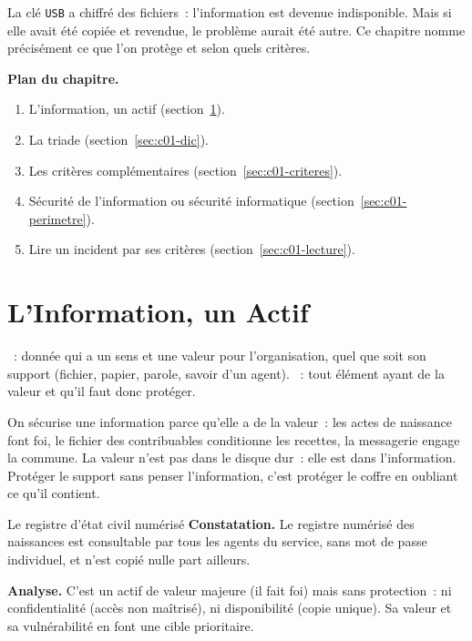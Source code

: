 La clé \texttt{USB} a chiffré des fichiers~: l'information est devenue
indisponible. Mais si elle avait été copiée et revendue, le problème aurait
été autre. Ce chapitre nomme précisément ce que l'on protège et selon quels
critères.

\medskip
\textbf{Plan du chapitre.}
\begin{enumerate}
    \item L'information, un actif (section~\ref{sec:c01-actif}).
    \item La triade  (section~\ref{sec:c01-dic}).
    \item Les critères complémentaires (section~\ref{sec:c01-criteres}).
    \item Sécurité de l'information ou sécurité informatique (section~\ref{sec:c01-perimetre}).
    \item Lire un incident par ses critères (section~\ref{sec:c01-lecture}).
\end{enumerate}

\separateur

\section{L'Information, un Actif}
\label{sec:c01-actif}

\begin{boxdef}
~: donnée qui a un sens et une valeur pour
l'organisation, quel que soit son support (fichier, papier, parole, savoir
d'un agent). ~: tout élément ayant de la valeur et qu'il faut
donc protéger.
\end{boxdef}

On sécurise une information parce qu'elle a de la valeur~: les actes de
naissance font foi, le fichier des contribuables conditionne les recettes, la
messagerie engage la commune. La valeur n'est pas dans le disque dur~: elle est
dans l'information. Protéger le support sans penser l'information, c'est
protéger le coffre en oubliant ce qu'il contient.

\begin{boxobjet}{Le registre d'état civil numérisé}
\textbf{Constatation.} Le registre numérisé des naissances est consultable par
tous les agents du service, sans mot de passe individuel, et n'est copié nulle
part ailleurs.

\medskip
\textbf{Analyse.} C'est un actif de valeur majeure (il fait foi) mais sans
protection~: ni confidentialité (accès non maîtrisé), ni disponibilité (copie
unique). Sa valeur et sa vulnérabilité en font une cible prioritaire.
\end{boxobjet}

